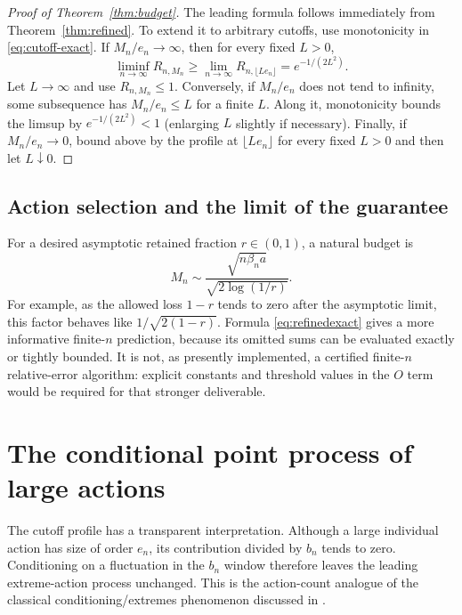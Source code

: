 \documentclass[11pt,a4paper]{article}
\numberwithin{equation}{section}
\theoremstyle{definition}
\theoremstyle{remark}
\begin{document}
\begin{proof}[Proof of Theorem~\ref{thm:budget}]
The leading formula follows immediately from
Theorem~\ref{thm:refined}. To extend it to arbitrary cutoffs, use
monotonicity in \eqref{eq:cutoff-exact}. If $M_n/e_n\to\infty$, then
for every fixed $L>0$,
\[
 \liminf_{n\to\infty}R_{n,M_n}
 \ge\lim_{n\to\infty}R_{n,\lfloor Le_n\rfloor}
 =e^{-1/(2L^2)}.
\]
Let $L\to\infty$ and use $R_{n,M_n}\le1$.
Conversely, if $M_n/e_n$ does not tend to infinity, some subsequence
has $M_n/e_n\le L$ for a finite $L$. Along it, monotonicity bounds the
limsup by $e^{-1/(2L^2)}<1$ (enlarging $L$ slightly if necessary).
Finally, if $M_n/e_n\to0$, bound above by the profile at
$\lfloor Le_n\rfloor$ for every fixed $L>0$ and then let $L\downarrow0$.
\end{proof}

\subsection{Action selection and the limit of the guarantee}
For a desired asymptotic retained fraction $r\in(0,1)$, a natural budget
is
\begin{equation}\label{eq:selection}
 M_n\sim\frac{\sqrt{n\beta_n a}}{\sqrt{2\log(1/r)}}.
\end{equation}
For example, as the allowed loss $1-r$ tends to zero after the asymptotic
limit, this factor behaves like $1/\sqrt{2(1-r)}$. Formula
\eqref{eq:refinedexact} gives a more informative finite-$n$ prediction,
because its omitted sums can be evaluated exactly or tightly bounded.
It is not, as presently implemented, a certified finite-$n$ relative-error
algorithm: explicit constants and threshold values in the $O$ term would
be required for that stronger deliverable.

\section{The conditional point process of large actions}
\label{sec:pointprocess}

The cutoff profile has a transparent interpretation. Although a large
individual action has size of order $e_n$, its contribution divided by
$b_n$ tends to zero. Conditioning on a fluctuation in the $b_n$ window
therefore leaves the leading extreme-action process unchanged. This is
the action-count analogue of the classical conditioning/extremes
phenomenon discussed in \cite{janson}.
\end{document}
